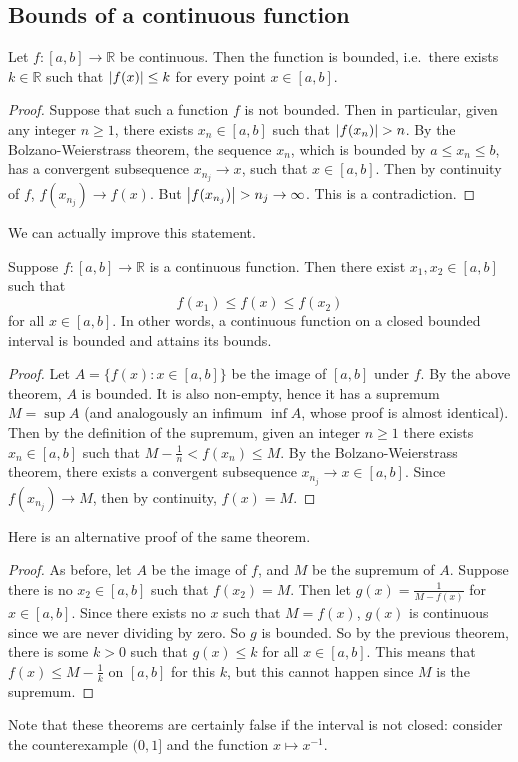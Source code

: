 \subsection{Bounds of a continuous function}
\begin{theorem}
	Let \(f \colon [a, b] \to \mathbb R\) be continuous.
	Then the function is bounded, i.e.\ there exists \(k \in \mathbb R\) such that \(\abs{f(x)} \leq k\) for every point \(x \in [a, b]\).
\end{theorem}
\begin{proof}
	Suppose that such a function \(f\) is not bounded.
	Then in particular, given any integer \(n \geq 1\), there exists \(x_n \in [a, b]\) such that \(\abs{f(x_n)} > n\).
	By the Bolzano-Weierstrass theorem, the sequence \(x_n\), which is bounded by \(a \leq x_n \leq b\), has a convergent subsequence \(x_{n_j} \to x\), such that \(x \in [a, b]\).
	Then by continuity of \(f\), \(f(x_{n_j}) \to f(x)\).
	But \(\abs{f(x_{n_j})} > n_j \to \infty\).
	This is a contradiction.
\end{proof}
\noindent We can actually improve this statement.
\begin{theorem}
	Suppose \(f \colon [a, b] \to \mathbb R\) is a continuous function.
	Then there exist \(x_1, x_2 \in [a, b]\) such that
	\[
		f(x_1) \leq f(x) \leq f(x_2)
	\]
	for all \(x \in [a, b]\).
	In other words, a continuous function on a closed bounded interval is bounded and attains its bounds.
\end{theorem}
\begin{proof}
	Let \(A = \{ f(x) \colon x \in [a, b] \}\) be the image of \([a, b]\) under \(f\).
	By the above theorem, \(A\) is bounded.
	It is also non-empty, hence it has a supremum \(M = \sup A\) (and analogously an infimum \(\inf A\), whose proof is almost identical).
	Then by the definition of the supremum, given an integer \(n \geq 1\) there exists \(x_n \in [a, b]\) such that \(M - \frac{1}{n} < f(x_n) \leq M\).
	By the Bolzano-Weierstrass theorem, there exists a convergent subsequence \(x_{n_j} \to x \in [a, b]\).
	Since \(f(x_{n_j}) \to M\), then by continuity, \(f(x) = M\).
\end{proof}
\noindent Here is an alternative proof of the same theorem.
\begin{proof}
	As before, let \(A\) be the image of \(f\), and \(M\) be the supremum of \(A\).
	Suppose there is no \(x_2 \in [a, b]\) such that \(f(x_2) = M\).
	Then let \(g(x) = \frac{1}{M - f(x)}\) for \(x \in [a, b]\).
	Since there exists no \(x\) such that \(M = f(x)\), \(g(x)\) is continuous since we are never dividing by zero.
	So \(g\) is bounded.
	So by the previous theorem, there is some \(k > 0\) such that \(g(x) \leq k\) for all \(x \in [a, b]\).
	This means that \(f(x) \leq M - \frac{1}{k}\) on \([a, b]\) for this \(k\), but this cannot happen since \(M\) is the supremum.
\end{proof}
\noindent Note that these theorems are certainly false if the interval is not closed: consider the counterexample \((0, 1]\) and the function \(x \mapsto x^{-1}\).


